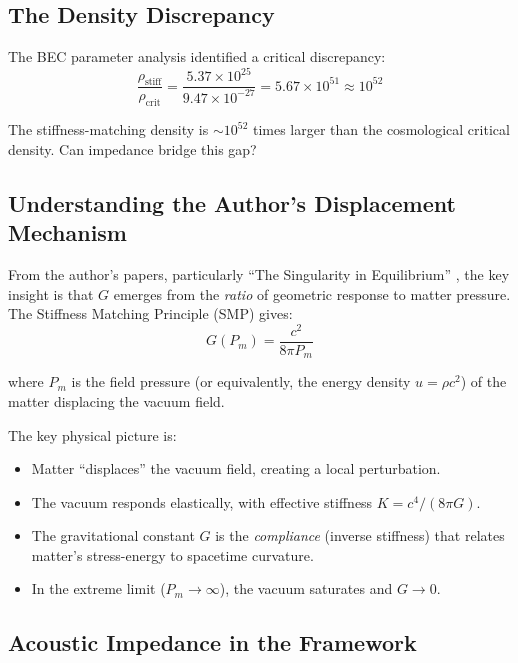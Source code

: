 \documentclass[11pt,a4paper]{article}
\newcommand{\ee}[1]{\times 10^{#1}}
\newcommand{\rhocrit}{\ensuremath{\rho_{\mathrm{crit}}}}
\newcommand{\rhostiff}{\ensuremath{\rho_{\mathrm{stiff}}}}
\theoremstyle{definition}
\begin{document}
\subsection{The Density Discrepancy}
\label{sec:density_discrepancy}

The BEC parameter analysis identified a critical discrepancy:
\begin{equation}
\frac{\rhostiff}{\rhocrit} = \frac{5.37 \ee{25}}{9.47 \ee{-27}} = 5.67 \ee{51} \approx 10^{52}
\end{equation}

The stiffness-matching density is $\sim 10^{52}$ times larger than the cosmological critical density. Can impedance bridge this gap?

\subsection{Understanding the Author's Displacement Mechanism}
\label{sec:displacement_mechanism}

From the author's papers, particularly ``The Singularity in Equilibrium'' \cite{SkavbergMechGR2025}, the key insight is that $G$ emerges from the \emph{ratio} of geometric response to matter pressure. The Stiffness Matching Principle (SMP) gives:
\begin{equation}
\label{eq:SMP}
G(P_m) = \frac{c^2}{8\pi P_m}
\end{equation}

where $P_m$ is the field pressure (or equivalently, the energy density $u = \rho c^2$) of the matter displacing the vacuum field.

The key physical picture is:
\begin{itemize}
    \item Matter ``displaces'' the vacuum field, creating a local perturbation.
    \item The vacuum responds elastically, with effective stiffness $K = c^4/(8\pi G)$.
    \item The gravitational constant $G$ is the \emph{compliance} (inverse stiffness) that relates matter's stress-energy to spacetime curvature.
    \item In the extreme limit ($P_m \to \infty$), the vacuum saturates and $G \to 0$.
\end{itemize}

\subsection{Acoustic Impedance in the Framework}
\label{sec:impedance_def}
\end{document}
